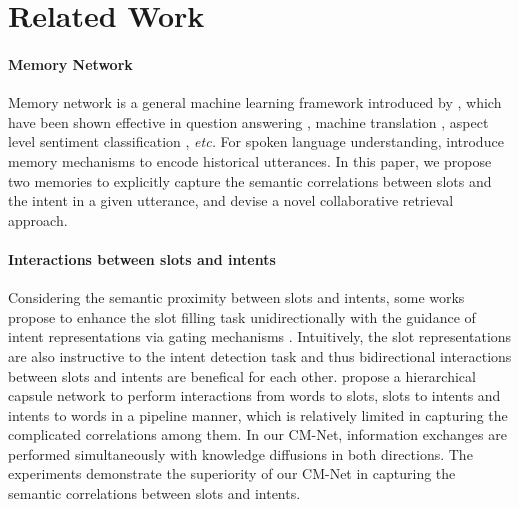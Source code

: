 \documentclass[11pt,a4paper]{article}
\begin{document}
\begin{table}[t!]
\begin{center}
\end{center}
\caption{Results on our CAIS dataset, where ``" indicates our implementation of the S-LSTM.}
\label{self_result}
\end{table}

\section{Related Work}
\paragraph{Memory Network} 
Memory network is a general machine learning framework introduced by \citeauthor{memory_2014} , which have been shown effective in question answering \cite{memory_2014,memory_2015}, machine translation \cite{memory_mt_2016,memory_mt_2017}, aspect level sentiment classification \cite{memory_absa_2016},  {\em etc.} For spoken language understanding, \citeauthor{memory_slu_2016}  introduce memory mechanisms to encode historical utterances. In this paper, we propose two memories to explicitly capture the semantic correlations between slots and the intent in a given utterance, and devise a novel collaborative retrieval approach.

\paragraph{Interactions between slots and intents}
Considering the semantic proximity between slots and intents, some works propose to enhance the slot filling task unidirectionally with the guidance of intent representations via gating mechanisms \cite{slot_gated_2018, self_attentive_2018}. Intuitively, the slot representations are also instructive to the intent detection task and thus bidirectional interactions between slots and intents are benefical for each other.
\citeauthor{capsule_2018}  propose a hierarchical capsule network to perform interactions from words to slots, slots to intents and intents to words in a pipeline manner, which is relatively limited in capturing the complicated correlations among them. In our CM-Net, information exchanges are performed simultaneously with knowledge diffusions in both directions. 
The experiments demonstrate the superiority of our CM-Net in capturing the semantic correlations between slots and intents.
\end{document}
